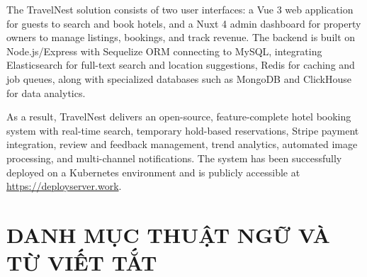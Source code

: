 \documentclass[13pt,a4paper,twoside]{report}
\begin{document}
The TravelNest solution consists of two user interfaces: a Vue 3 web application for guests to search and book hotels, and a Nuxt 4 admin dashboard for property owners to manage listings, bookings, and track revenue. The backend is built on Node.js/Express with Sequelize ORM connecting to MySQL, integrating Elasticsearch for full-text search and location suggestions, Redis for caching and job queues, along with specialized databases such as MongoDB and ClickHouse for data analytics.

As a result, TravelNest delivers an open-source, feature-complete hotel booking system with real-time search, temporary hold-based reservations, Stripe payment integration, review and feedback management, trend analytics, automated image processing, and multi-channel notifications. The system has been successfully deployed on a Kubernetes environment and is publicly accessible at \url{https://deployserver.work}.

\newpage

\renewcommand{\contentsname}{MỤC LỤC}
\tableofcontents
\newpage

\renewcommand{\listfigurename}{DANH MỤC HÌNH VẼ}
\listoffigures
\newpage

\renewcommand{\listtablename}{DANH MỤC BẢNG BIỂU}
\listoftables
\newpage

\chapter*{DANH MỤC THUẬT NGỮ VÀ TỪ VIẾT TẮT}
\end{document}
